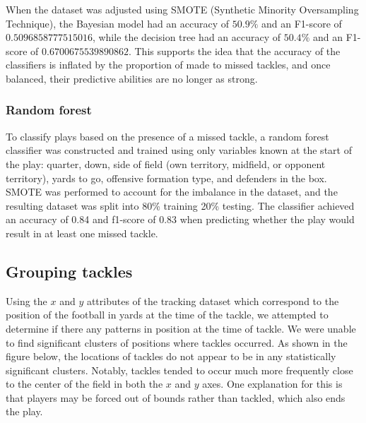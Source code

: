 \documentclass[bibtex, sigconf, hyperref={colorlinks=true,linkcolor=blue,urlcolor=blue}]{acmart}
\begin{document}
When the dataset was adjusted using SMOTE (Synthetic Minority Oversampling Technique), the
Bayesian model had an accuracy of $50.9\%$ and an F1-score of $0.5096858777515016$, while the
decision tree had an accuracy of $50.4\%$ and an F1-score of $0.6700675539890862$. This supports
the idea that the accuracy of the classifiers is inflated by the proportion of made to missed tackles,
and once balanced, their predictive abilities are no longer as strong.

\subsubsection{Random forest}

To classify plays based on the presence of a missed tackle, a random forest
classifier was constructed and trained using only variables known at the start
of the play: quarter, down, side of field (own territory, midfield, or opponent
territory), yards to go, offensive formation type, and defenders in the box.
SMOTE was performed to account for the imbalance in the dataset, and the
resulting dataset was split into 80\% training 20\% testing. The classifier
achieved an accuracy of 0.84 and f1-score of 0.83 when predicting whether the
play would result in at least one missed tackle.

\subsection{Grouping tackles}

Using the $x$ and $y$ attributes of the tracking dataset which correspond to the
position of the football in yards at the time of the tackle, we attempted to
determine if there any patterns in position at the time of tackle.
We were unable to find significant clusters of positions where tackles
occurred. As shown in the figure below, the locations of tackles do not appear
to be in any statistically significant clusters. Notably, tackles tended to
occur much more frequently close to the center of the field in both the $x$ and
$y$ axes. One explanation for this is that players may be forced out of bounds
rather than tackled, which also ends the play.
\end{document}
